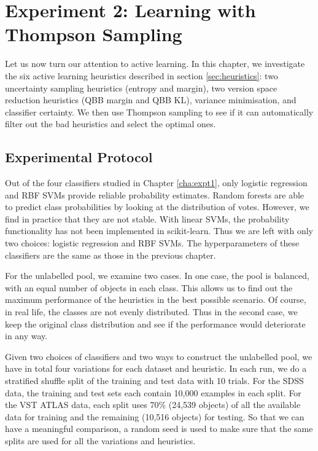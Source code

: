 

\chapter{Experiment 2: Learning with Thompson Sampling}
\label{cha:expt2}

Let us now turn our attention to active learning. In this chapter, we investigate the six active
learning heuristics described in section \ref{sec:heuristics}: two uncertainty sampling heuristics
(entropy and margin), two version space reduction heuristics (QBB margin and QBB KL), variance
minimisation, and classifier certainty. We then use Thompson sampling to see if it can
automatically filter out the bad heuristics and select the optimal ones.


\section{Experimental Protocol}
\label{sec:protocol2}

Out of the four classifiers studied in Chapter \ref{cha:expt1}, only logistic regression and RBF
SVMs provide reliable probability estimates. Random forests are able to predict class probabilities
by looking at the distribution of votes. However, we find in practice that they are not stable.
With linear SVMs, the probability functionality has not been implemented in scikit-learn. Thus we
are left with only two choices: logistic regression and RBF SVMs. The hyperparameters of these
classifiers are the same as those in the previous chapter.

For the unlabelled pool, we examine two cases. In one case, the pool is balanced, with an equal
number of objects in each class. This allows us to find out the maximum performance of the
heuristics in the best possible scenario. Of course, in real life, the classes are not evenly
distributed. Thus in the second case, we keep the original class distribution and see if the
performance would deteriorate in any way.

Given two choices of classifiers and two ways to construct the unlabelled pool, we have in total
four variations for each dataset and heuristic. In each run, we do a stratified shuffle split of
the training and test data with 10 trials. For the SDSS data, the training and test sets each
contain 10,000 examples in each split. For the VST ATLAS data, each split uses 70\% (24,539
objects) of all the available data for training and the remaining (10,516 objects) for testing. So
that we can have a meaningful comparison, a random seed is used to make sure that the same splits
are used for all the variations and heuristics.

